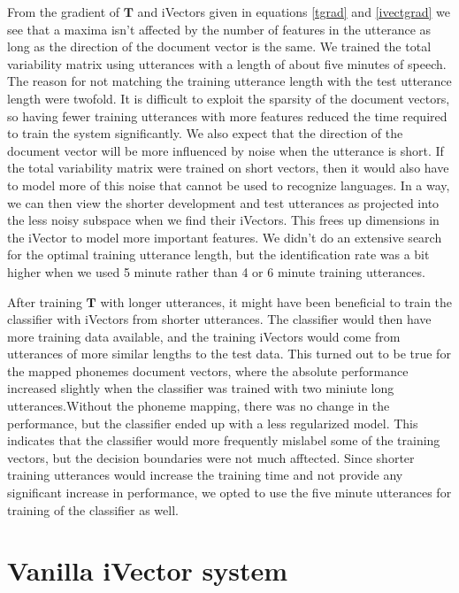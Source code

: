 From the gradient of $\mathbf{T}$ and iVectors given in equations \ref{tgrad} and \ref{ivectgrad} we see that a maxima isn't affected by the number of features in the utterance as long as the direction of the document vector is the same. We trained the total variability matrix using utterances with a length of about five minutes of speech. The reason for not matching the training utterance length with the test utterance length were twofold. It is difficult to exploit the sparsity of the document vectors, so having fewer training utterances with more features reduced the time required to train the system significantly. We also expect that the direction of the document vector will be more influenced by noise when the utterance is short. If the total variability matrix were trained on short vectors, then it would also have to model more of this noise that cannot be used to recognize languages. In a way, we can then view the shorter development and test utterances as projected into the less noisy subspace when we find their iVectors. This frees up dimensions in the iVector to model more important features. We didn't do an extensive search for the optimal training utterance length, but the identification rate was a bit higher when we used 5 minute rather than 4 or 6 minute training utterances.

After training $\mathbf{T}$ with longer utterances, it might have been beneficial to train the classifier with iVectors from shorter utterances. The classifier would then have more training data available, and the training iVectors would come from utterances of more similar lengths to the test data. This turned out to be true for the mapped phonemes document vectors, where the absolute performance increased slightly when the classifier was trained with two miniute long utterances.Without the phoneme mapping, there was no change in the performance, but the classifier ended up with a less regularized model. This indicates that the classifier would more frequently mislabel some of the training vectors, but the decision boundaries were not much afftected. Since shorter training utterances would increase the training time and not provide any significant increase in performance, we opted to use the five minute utterances for training of the classifier as well.


\section{Vanilla iVector system}
\label{sect:vanillaivect}

